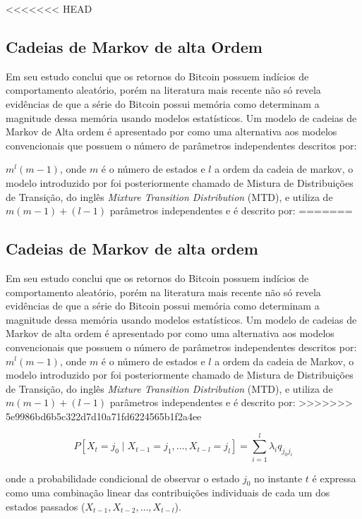 \documentclass[
    12pt,                %
    openright,           %
    oneside,             %
    a4paper,             %
    english,             %
    brazil               %
]{abntex2}
\begin{document}
<<<<<<< HEAD
\subsection{Cadeias de Markov de alta Ordem}
Em seu estudo \cite{URQUHART} conclui que os retornos do Bitcoin possuem indícios de comportamento aleatório, porém na literatura mais recente \cite{NASCIMENTO} não só revela 
evidências de que a série do Bitcoin possui memória como determinam a magnitude dessa memória usando modelos estatísticos. Um modelo de cadeias de Markov de Alta ordem é 
apresentado por  como uma alternativa aos modelos convencionais que possuem o número de parâmetros independentes descritos por:

$m^l(m - 1)$, onde $m$ é o número de estados e $l$ a ordem da cadeia de markov, o modelo introduzido por  foi posteriormente chamado de Mistura de 
Distribuições de Transição, do inglês \textit{Mixture Transition Distribution} (MTD), e utiliza de $m(m -1) + (l - 1)$ parâmetros independentes e é descrito por:
=======
\subsection{Cadeias de Markov de alta ordem}
Em seu estudo \cite{URQUHART} conclui que os retornos do Bitcoin possuem indícios de comportamento aleatório, porém na literatura mais recente \cite{NASCIMENTO} não só revela evidências de que a série do Bitcoin possui memória como determinam a magnitude dessa memória usando modelos estatísticos. Um modelo de cadeias de Markov de alta ordem é apresentado por  como uma alternativa aos modelos convencionais que possuem o número de parâmetros independentes descritos por:
$m^l(m - 1)$, onde $m$ é o número de estados e $l$ a ordem da cadeia de Markov, o modelo introduzido por  foi posteriormente chamado de Mistura de Distribuições de Transição, do inglês \textit{Mixture Transition Distribution} (MTD), e utiliza de $m(m -1) + (l - 1)$ parâmetros independentes e é descrito por:
>>>>>>> 5e9986bd6b5c322d7d10a71fd6224565b1f2a4ee

\begin{equation}
    P[X_{t}=j_{0} \mid X_{t-1}=j_{1}, \dots, X_{t-l}=j_{l}] = \sum_{i=1}^{l}\lambda_{i}q_{j_{0}j_{i}}
\end{equation}

onde a probabilidade condicional de observar o estado $j_0$ no instante $t$ é expressa como uma combinação linear das contribuições individuais de cada um dos estados 
passados ($X_{t-1}, X_{t-2}, \dots, X_{t-l}$).
\end{document}
